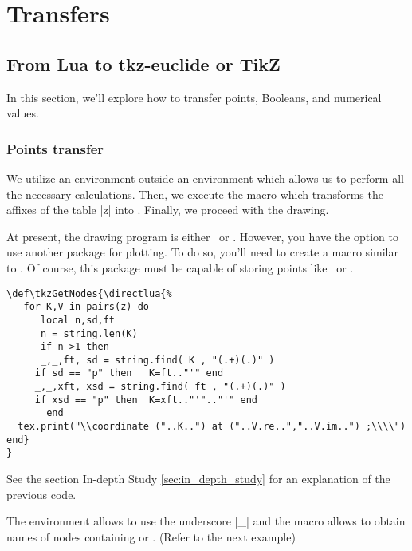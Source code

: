 
\newpage
\section{Transfers} %
\label{sec:transfers}
\subsection{From Lua to tkz-euclide or TikZ} %
\label{sub:fom_lua_to_tkz_euclide_or_tikz}

In this section, we'll explore how to transfer points, Booleans, and numerical values.

\subsubsection{Points transfer} %
\label{ssub:points_transfer}
We utilize an environment   outside an   environment which allows us to perform  all the necessary calculations. Then, we execute the macro  which transforms the affixes of the table |z| into  . Finally, we proceed with the drawing.

At present, the drawing program is either \TIKZ\ or . However, you have the option to use another package for plotting. To do so, you'll need to create a macro similar to . Of course, this package must be capable of storing points like \TIKZ\ or . 

\vspace*{1em}

\begin{mybox}
\begin{Verbatim}
\def\tkzGetNodes{\directlua{%
   for K,V in pairs(z) do
      local n,sd,ft
      n = string.len(K)
      if n >1 then
      _,_,ft, sd = string.find( K , "(.+)(.)" )  
     if sd == "p" then   K=ft.."'" end 
     _,_,xft, xsd = string.find( ft , "(.+)(.)" ) 
     if xsd == "p" then  K=xft.."'".."'" end 
       end    
  tex.print("\\coordinate ("..K..") at ("..V.re..","..V.im..") ;\\\\")
end}
}
\end{Verbatim}
\end{mybox}
See the section In-depth Study \ref{sec:in_depth_study} for an explanation of the previous code.

The environment  allows to use the underscore |_| and the macro  allows to obtain names of nodes containing  or . (Refer to the next example)

